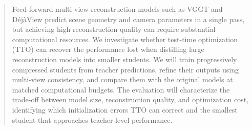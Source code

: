 \begin{abstract}
Feed-forward multi-view reconstruction models such as VGGT and DéjàView predict scene geometry and camera parameters in a single pass, but achieving high reconstruction quality can require substantial computational resources. We investigate whether test-time optimization (TTO) can recover the performance lost when distilling large reconstruction models into smaller students. We will train progressively compressed students from teacher predictions, refine their outputs using multi-view consistency, and compare them with the original models at matched computational budgets. The evaluation will characterize the trade-off between model size, reconstruction quality, and optimization cost, identifying which initialization errors TTO can correct and the smallest student that approaches teacher-level performance.

\end{abstract}